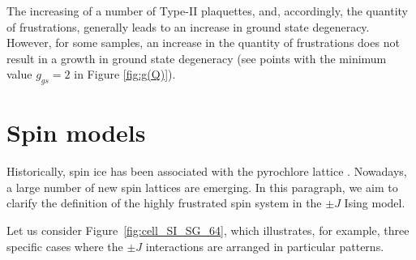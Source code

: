 \documentclass[preprint,12pt]{elsarticle}
\begin{document}
	The increasing of a number of Type-II plaquettes, and, accordingly, the quantity of frustrations, generally leads to an increase in ground state degeneracy. However, for some samples, an increase in the quantity of frustrations does not result in a growth in ground state degeneracy (see points with the minimum value $g_{gs}=2$ in Figure \ref{fig:g(Q)}). 
	
	\section{Spin models}
	
	Historically, spin ice has been associated with the pyrochlore lattice \cite{skjaervo2020advances, bramwell2020history, udagawa2021spin, ortiz2019colloquium, budrikis2021fifty, castelnovo2012spin}.
	Nowadays, a large number of new spin lattices are emerging. In this paragraph, we aim to clarify the definition of the highly frustrated spin system in the $\pm J$ Ising model.
	
	Let us consider Figure~\ref{fig:cell_SI_SG_64}, which illustrates, for example, three specific cases where the $\pm J$ interactions are arranged in particular patterns.
\end{document}
